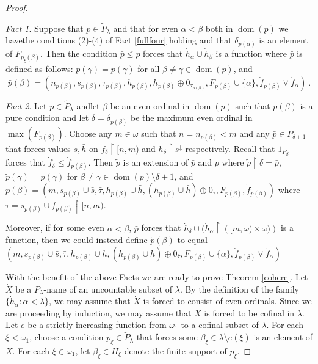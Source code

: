 \documentclass{amsart}
\theoremstyle{definition}
\theoremstyle{remark}
\newtheorem{Fact}{Fact}
\def\dom{\operatorname{dom}}
\begin{document}
\begin{proof}
\begin{Fact} Suppose that $p\in \tilde P_\lambda$ and that for
even $\alpha < \beta$ both in $\dom(p)$ we have\label{just3}
the conditions (2)-(4) of Fact \ref{fullfour} holding
and that $\delta_{p(\alpha)}$ is an element of $F_{p_\xi(\beta)}$.
Then the  condition $\bar p \leq p$ forces that $
\dot h_\alpha\cup \dot h_\beta$ is a function where
$\bar p$ is defined as follows: 
$\bar p(\gamma)=p(\gamma)$ for all $\beta\neq \gamma \in \dom(p)$,
and 
$$\bar p(\beta) = (n_{p(\beta)}, s_{p(\beta)},
 \tau_{p(\beta)}, h_{p(\beta)}, h_{p(\beta)}\oplus 0_{\tau_{p(\beta)}} , 
   F_{p(\beta)}\cup \{ \alpha\}, \dot f_{p(\beta)} \vee \dot f_\alpha)~.$$
\end{Fact}

\begin{Fact} Let $p\in \tilde P_\lambda$ and\label{addmu}
let $  \beta$ be an even ordinal
in $\dom(p)$ such that  $p(\beta)$ is a   pure condition
and let $\delta = \delta_{p(\beta)}$ be the maximum even ordinal 
in $  \max(F_{p(\beta)})$.  Choose
any $m\in\omega$ such that $n = n_{p(\beta)}< m$ and any
$\bar p\in P_{\delta+1}$ that forces   values $\bar s, \bar h$
on $\dot f_\delta\restriction [n,m)$ and $\dot h_\delta\restriction 
\bar s^{\downarrow}$ respectively.
Recall that $1_{P_\beta}$ forces that $\dot f_\delta\leq \dot f_{p(\beta)}$.
Then $\tilde p$ is an extension
of $\bar p$ and $p$ where $\tilde p\restriction \delta = \bar p$,
 $\tilde p(\gamma) = p(\gamma)$ for $\beta\neq \gamma \in \dom(p) 
 \setminus \delta{+}1$,
 and $\tilde p(\beta) =
 (m, s_{p(\beta)}\cup \bar s, \bar \tau , h_{p(\beta)}\cup \bar h,
 ( h_{p(\beta)}\cup \bar h)\oplus 0_{\bar\tau}, F_{p(\beta)}, \dot f_{p(\beta)})$
 where $\bar\tau = s_{p(\beta)}\cup \dot f_{p(\beta)}\restriction [n,m)$.
 \medskip

 Moreover, if for some even $\alpha <\beta$, $\bar p$ forces
 that $\dot h_\delta\cup (\dot h_\alpha \restriction \left([m,\omega)\times \omega )\right)$
 is a function, then we could instead define $\tilde p(\beta)$
 to equal $
 (m, s_{p(\beta)}\cup \bar s, \bar \tau , h_{p(\beta)}\cup \bar h,
 ( h_{p(\beta)}\cup \bar h)\oplus 0_{\bar\tau}, F_{p(\beta)}\cup\{\alpha\}, \dot f_{p(\beta)}
\vee \dot f_\alpha )$
\end{Fact}

 
\bigskip

With the benefit of the above Facts we are ready to prove Theorem \ref{cohere}.
Let $\dot X$
be a $P_\lambda$-name of an uncountable subset of $\lambda$.
By the definition of the family $\{ \dot h_\alpha : \alpha<\lambda\}$,
 we may assume that $\dot X$ is forced to consist of even ordinals.
Since we are proceeding by induction, we may assume
that $\dot X$ is forced to be cofinal in $\lambda$.
Let $e$ be a strictly increasing function from $\omega_1$
to a cofinal subset of $\lambda$.
 For each $\xi < \omega_1$, choose a condition $p_\xi\in \tilde P_\lambda$
 that forces some $ \beta_\xi \in \lambda\setminus e(\xi) $ is an element
 of $\dot X$. For each $\xi\in\omega_1$, let $\beta_\xi\in H_\xi$ denote the finite
 support of $p_\xi$. 


\end{proof}
\end{document}

